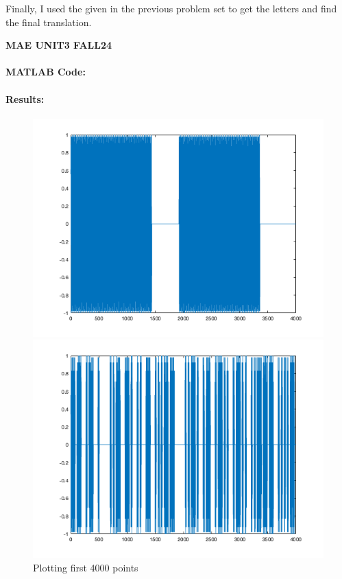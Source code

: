 Finally, I used the  given in the previous problem
set to get the letters and find the final translation.

{\bf MAE UNIT3 FALL24}

\paragraph{MATLAB Code:}

\begin{tiny}
    
\end{tiny}

\paragraph{Results:}

\begin{figure}[H]
    \centering
    \begin{minipage}{.5\textwidth}
        \centering
        \includegraphics[width=\linewidth]{figures/ex3_firstN.png}
        \caption{Plotting first 4000 points}
        \label{fig:figures/ex3_firstN.png}
    \end{minipage}%
    \begin{minipage}{.5\textwidth}
        \centering
        \includegraphics[width=\linewidth]{figures/ex3_N.png}

\end{minipage}
\end{figure}
